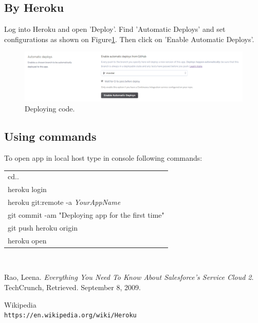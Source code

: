 \documentclass[12pt,a4paper]{article}
\begin{document}
\subsection{By Heroku}
Log into Heroku and open 'Deploy'. Find 'Automatic Deploys' and set configurations as shown on Figure\ref{fig:dep}. Then click on 'Enable Automatic Deploys'.

\begin{figure}[H]
	\centering
	\includegraphics[width=1\textwidth]{images/deploy.PNG}
	\caption{Deploying code.}
	\label{fig:dep}
\end{figure}

\subsection{Using commands}
To open app in local host type in console following commands:\\
\begin{tabular}{|l|}
	\hline
	cd..\\
	heroku login\\
	heroku git:remote -a \textit{YourAppName}\\
	git commit -am "Deploying app for the first time"\\
	git push heroku origin\\
	heroku open\\
	\hline
\end{tabular}\\

\begin{thebibliography}{bib}
	 Rao, Leena. 
	\textit{Everything You Need To Know About Salesforce's Service Cloud 2}. 
	TechCrunch, Retrieved. September 8, 2009.
	 
	
	Wikipedia
	\\\texttt{https://en.wikipedia.org/wiki/Heroku}
	
\end{thebibliography}
\end{document}
